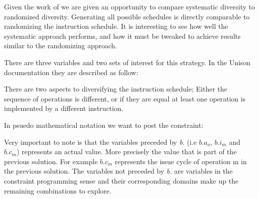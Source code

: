 Given the work of \textcite{large-scale-automated} we are given an opportunity to compare
systematic diversity to randomized diversity. Generating all possible schedules is directly
comparable to randomizing the instruction schedule. It is interesting to see how well
the systematic approach performs, and how it must be tweaked to achieve results similar
to the randomizing approach.

There are three variables and two sets of interest for this strategy. In the Unison documentation
they are described as follow:

\vspace{0.2cm}

\noindent{}

\vspace{0.2cm}

There are two aspects to diversifying the instruction schedule; Either the sequence of
operations is different, or if they are equal at least one operation is implemented by a
different instruction.

In psuedo mathematical notation we want to post the constraint:

\vspace{0.2cm}
\noindent{}
\vspace{0.2cm}

Very important to note is that the variables preceded by \textit{b.} (i.e $b.a_o$, $b.i_m$
and $b.c_m$) represents an actual value. More precisely the value that is part of the
previous solution. For example $b.c_m$ represents the issue cycle of operation m in the
previous solution. The variables not preceded by \textit{b.} are variables in the
constraint programming sense and their corresponding domains make up the remaining
combinations to explore.

